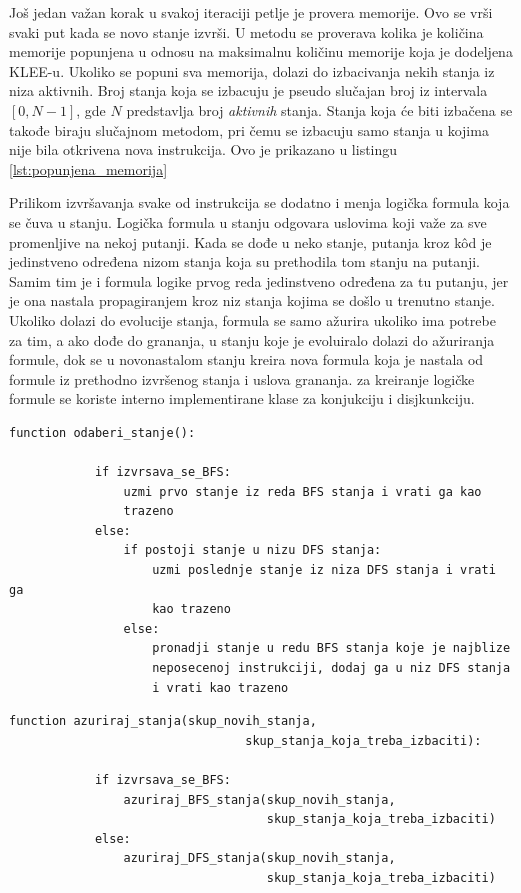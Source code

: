\documentclass[12pt,oneside]{memoir}
\begin{document}
Još jedan važan korak u svakoj iteraciji petlje je provera memorije. Ovo se vrši svaki put kada se novo stanje izvrši. U metodu se proverava kolika je količina memorije popunjena u odnosu na maksimalnu količinu memorije koja je dodeljena KLEE-u. Ukoliko se popuni sva memorija, dolazi do izbacivanja nekih stanja iz niza aktivnih. Broj stanja koja se izbacuju je pseudo slučajan broj iz intervala $[0, N - 1]$, gde $N$ predstavlja broj \textit{aktivnih} stanja. Stanja koja će biti izbačena se takođe biraju slučajnom metodom, pri čemu se izbacuju samo stanja u kojima nije bila otkrivena nova instrukcija. Ovo je prikazano u listingu \ref{lst:popunjena_memorija}

Prilikom izvršavanja svake od instrukcija se dodatno i menja logička formula koja se čuva u stanju. Logička formula u stanju odgovara uslovima koji važe za sve promenljive na nekoj putanji. Kada se dođe u neko stanje, putanja kroz k\^od je jedinstveno određena nizom stanja koja su prethodila tom stanju na putanji. Samim tim je i formula logike prvog reda jedinstveno određena za tu putanju, jer je ona nastala propagiranjem kroz niz stanja kojima se došlo u trenutno stanje. Ukoliko dolazi do evolucije stanja, formula se samo ažurira ukoliko ima potrebe za tim, a ako dođe do grananja, u stanju koje je evoluiralo dolazi do ažuriranja formule, dok se u novonastalom stanju kreira nova formula koja je nastala od formule iz prethodno izvršenog stanja i uslova grananja. za kreiranje logičke formule se koriste interno implementirane klase za konjukciju i disjkunkciju.   

    \begin{lstlisting}[caption={Pseudokod funkcije za odabir narednog stanja koje se izvršava},captionpos=b,label={lst:odaberi_stanje}]
        function odaberi_stanje():
        
            if izvrsava_se_BFS:
                uzmi prvo stanje iz reda BFS stanja i vrati ga kao 
                trazeno
            else:
                if postoji stanje u nizu DFS stanja:
                    uzmi poslednje stanje iz niza DFS stanja i vrati ga 
                    kao trazeno
                else:
                    pronadji stanje u redu BFS stanja koje je najblize 
                    neposecenoj instrukciji, dodaj ga u niz DFS stanja
                    i vrati kao trazeno
    \end{lstlisting}
    
    \begin{lstlisting}[caption={Pseudokod funkcije za azuriranje stanja},captionpos=b,label={lst:azuriraj_stanja}]
        function azuriraj_stanja(skup_novih_stanja, 
                                 skup_stanja_koja_treba_izbaciti):
                                 
            if izvrsava_se_BFS:
                azuriraj_BFS_stanja(skup_novih_stanja, 
                                    skup_stanja_koja_treba_izbaciti)
            else:
                azuriraj_DFS_stanja(skup_novih_stanja, 
                                    skup_stanja_koja_treba_izbaciti)
    \end{lstlisting}
    
\end{document}
